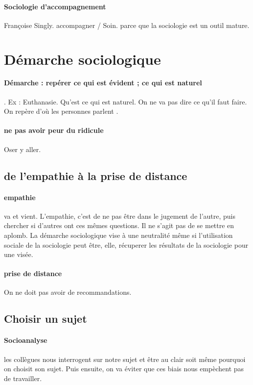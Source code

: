 \paragraph{Sociologie d’accompagnement} Françoise Singly. accompagner / Soin. parce que la sociologie est un outil mature.




\section{Démarche sociologique}
\paragraph{Démarche : repérer ce qui est évident ; ce qui est naturel}. Ex : Euthanasie. Qu’est ce qui est naturel. On ne va pas dire ce qu’il faut faire. On repère d’où les personnes parlent . 

\paragraph{ne pas avoir peur du ridicule} Oser y aller. 
\subsection{de l'empathie à la prise de distance}
\paragraph{empathie} va et vient. L'empathie, c'est de ne pas être dans le jugement de l'autre, puis chercher si d'autres ont ces mêmes questions. Il ne s'agit pas de se mettre en aplomb. La démarche sociologique vise à une neutralité même si l'utilisation sociale de la sociologie peut être, elle, récuperer les résultats de la sociologie pour une visée.

\paragraph{prise de distance} On ne doit pas avoir de recommandations.


\subsection{Choisir un sujet}

\paragraph{Socioanalyse} les collègues nous interrogent sur notre sujet et être au clair soit même pourquoi on choisit son sujet. Puis ensuite, on va éviter que ces biais nous empèchent pas de travailler.


